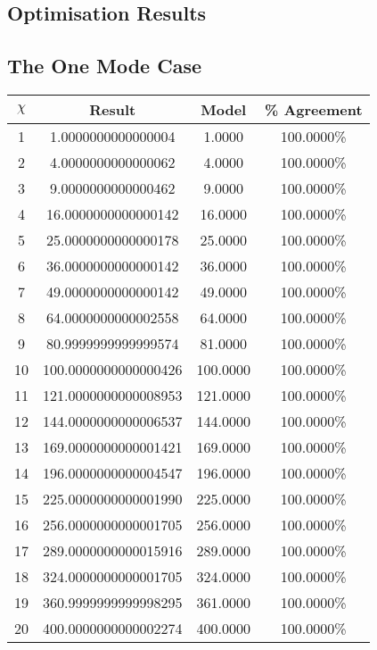 \documentclass[11pt,a4paper]{article}
\numberwithin{equation}{section}
\begin{document}
\begin{appendices}
	\section{Optimisation Results} 
	\subsection{The One Mode Case}
	\label{sec:onemodetable}
	\begin{center}
		\begin{tabular}{c|cc|c}
			$\chi$ & Result & Model & \% Agreement \\
			\hline
			1 & 1.0000000000000004 & 1.0000 & 100.0000\% \\
			2 & 4.0000000000000062 & 4.0000 & 100.0000\% \\
			3 & 9.0000000000000462 & 9.0000 & 100.0000\% \\
			4 & 16.0000000000000142 & 16.0000 & 100.0000\% \\
			5 & 25.0000000000000178 & 25.0000 & 100.0000\% \\
			6 & 36.0000000000000142 & 36.0000 & 100.0000\% \\
			7 & 49.0000000000000142 & 49.0000 & 100.0000\%\\
			8 & 64.0000000000002558 & 64.0000 & 100.0000\% \\
			9 & 80.9999999999999574 & 81.0000 & 100.0000\% \\
			10 & 100.0000000000000426 & 100.0000 & 100.0000\% \\
			11 & 121.0000000000008953 & 121.0000 & 100.0000\% \\
			12 & 144.0000000000006537 & 144.0000 & 100.0000\% \\
			13 & 169.0000000000001421 & 169.0000 & 100.0000\% \\
			14 & 196.0000000000004547 & 196.0000 & 100.0000\% \\
			15 & 225.0000000000001990 & 225.0000 & 100.0000\% \\
			16 & 256.0000000000001705 & 256.0000 & 100.0000\% \\
			17 & 289.0000000000015916 & 289.0000 & 100.0000\% \\
			18 & 324.0000000000001705 & 324.0000 & 100.0000\% \\
			19 & 360.9999999999998295 & 361.0000 & 100.0000\% \\
			20 & 400.0000000000002274 & 400.0000 & 100.0000\% \\
			\hline
		\end{tabular}
	\end{center}


\end{appendices}
\end{document}
